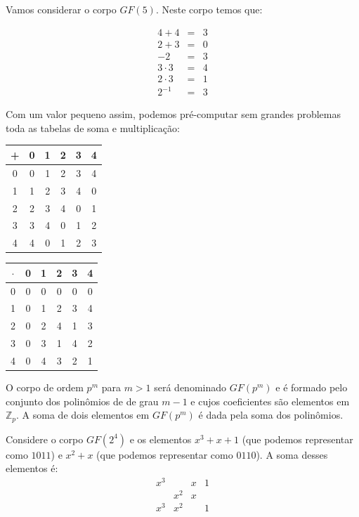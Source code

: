 \begin{example}
Vamos considerar o corpo $GF(5)$.
Neste corpo temos que:


\begin{eqnarray*}
4 + 4 &=& 3\\
2 + 3 &=& 0\\
-2 &=& 3\\
3 \cdot 3 &=& 4\\
2 \cdot 3 &=& 1\\
2^{-1} &=& 3  
\end{eqnarray*}

Com um valor pequeno assim, podemos pré-computar sem grandes problemas toda as tabelas de soma e multiplicação:

\begin{table}[htbp]
  \centering
  \begin{tabular}{c|ccccc}
    + & 0 & 1 & 2 & 3 & 4\\
    \hline
    0 & 0 & 1 & 2 & 3 & 4\\
    1 & 1 & 2 & 3 & 4 & 0\\
    2 & 2 & 3 & 4 & 0 & 1\\
    3 & 3 & 4 & 0 & 1 & 2\\
    4 & 4 & 0 & 1 & 2 & 3\\
  \end{tabular}
\end{table}

\begin{table}[htbp]
  \centering
  \begin{tabular}{c|ccccc}
    $\cdot$ & 0 & 1 & 2 & 3 & 4\\
    \hline
    0 & 0 & 0 & 0 & 0 & 0\\
    1 & 0 & 1 & 2 & 3 & 4\\
    2 & 0 & 2 & 4 & 1 & 3\\
    3 & 0 & 3 & 1 & 4 & 2\\
    4 & 0 & 4 & 3 & 2 & 1\\
  \end{tabular}
\end{table}
  
\end{example}

O corpo de ordem $p^m$ para $m>1$ será denominado $GF(p^m)$ e é formado pelo conjunto dos polinômios de de grau $m-1$ e cujos coeficientes são elementos em $\mathbb{Z}_p$.
A soma de dois elementos em $GF(p^m)$ é dada pela soma dos polinômios.


\begin{example}
  Considere o corpo $GF(2^4)$ e os elementos $x^3 + x + 1$ (que podemos representar como $1011$) e $x^2 + x$ (que podemos representar como $0110$).
A soma desses elementos é:
\begin{displaymath}
  \begin{array}{cccc}
    x^3 &     & x & 1\\
        & x^2 & x &  \\
    \hline
    x^3 & x^2 &   & 1
  \end{array}
\end{displaymath}
\end{example}
 

